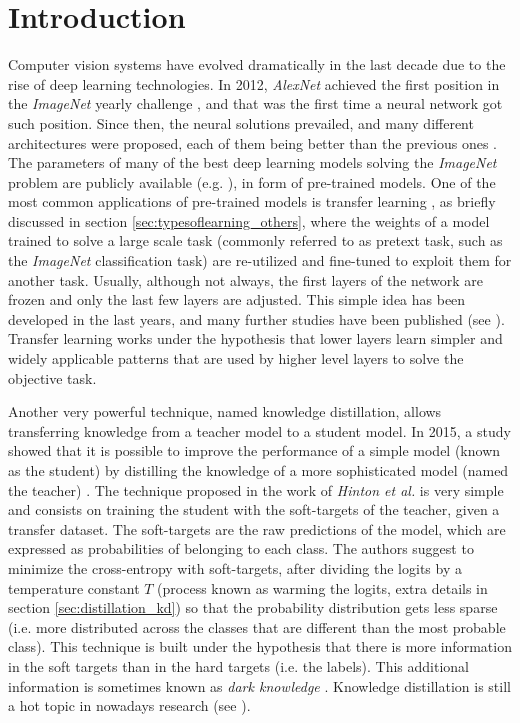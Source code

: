  \section{Introduction}
 Computer vision systems have evolved dramatically in the last decade due to the rise of deep learning technologies. In 2012, \textit{AlexNet} \autocite{krizhevsky2012} achieved the first position in the \textit{ImageNet} yearly challenge \autocite{ILSVRC15}, and that was the first time a neural network got such position. Since then, the neural solutions prevailed, and many different architectures were proposed, each of them being better than the previous ones \autocite{khan2020, algan2021}. The parameters of many of the best deep learning models solving the \textit{ImageNet} problem are publicly available (e.g. \autocite{he2016, chollet2017, szegedy2016, szegedy2017, howard2017, pham2018, tan2019}), in form of pre-trained models. One of the most common applications of pre-trained models is transfer learning \autocite{huang2021}, as briefly discussed in section \ref{sec:typesoflearning_others}, where the weights of a model  trained to solve a large scale task (commonly referred to as pretext task, such as the \textit{ImageNet} classification task) are re-utilized and fine-tuned to exploit them for another task. Usually, although not always, the first layers of the network are frozen and only the last few layers 
 are adjusted. This simple idea has been developed in the last years, and many further studies have been published (see \autocite{evci2022, zhu2018, wu2021, pzhao2021}). Transfer learning works under the hypothesis that lower layers learn simpler and widely applicable patterns that are used by higher level layers to solve the objective task.

 Another very powerful technique, named knowledge distillation, allows transferring knowledge from a teacher model to a student model. In 2015, a study showed that it is possible to improve the performance of a simple model (known as the student) by distilling the knowledge of a more sophisticated model (named the teacher) \autocite{hinton2015}. The technique proposed in the work of \textit{Hinton et al.} is very simple and consists on training the student with the soft-targets of the teacher, given a transfer dataset. The soft-targets are the raw predictions of the model, which are expressed as probabilities of belonging to each class. The authors suggest to minimize the cross-entropy with soft-targets, after dividing the logits by a temperature constant $T$ (process known as warming the logits, extra details in section \ref{sec:distillation_kd}) so that the probability distribution gets less sparse (i.e. more distributed across the classes that are different than the most probable class). This technique is built under the hypothesis that there is more information in the soft targets than in the hard targets (i.e. the labels). This additional information is sometimes known as \textit{dark knowledge} \autocite{gou2020}. Knowledge distillation is still a hot topic in nowadays research (see \autocite{tan2021, zhao2021, lee2021}).

